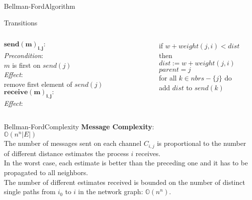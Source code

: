 \documentclass[pdf]{beamer}
\begin{document}
\begin{frame}{Bellman-Ford}{Algorithm}
    \begin{block}{Transitions}
        \vspace{2mm}
        \begin{columns}
            $\mathbf{send(m)_{i, j}:}$\\ 
            \emph{Precondition}: \\ 
            \small $m$ is first on $send(j)$ \\
            \normalsize \emph{Effect}: \\
            \small remove first element of $send(j)$
            \normalsize $\mathbf{receive(m)_{i, j}: }$ \\
            \emph{Effect}: \\
            \small
            \begin{tcolorbox}[colframe=red]
                if $w + weight(j, i) < dist$ then \\
                \hspace*{\parindent} $dist := w + weight(j, i)$ \\
                \hspace*{\parindent} $parent = j$ \\
                \hspace*{\parindent} for all $k \in nbrs - \{j\}$ do \\
                \hspace*{\parindent} \hspace*{\parindent} add $dist$ to $send(k)$ \\
            \end{tcolorbox}
        \end{columns}
    \end{block}
\end{frame}

\begin{frame}{Bellman-Ford}{Complexity}
	\textbf{Message Complexity}: \\
    \vspace{8pt}
    \pause
	$\mathbb{O}(n^n |E|)$ \\
    \vspace{8pt}
    \pause
    \small
    The number of messages sent on each channel $C_{i, j}$ is proportional to the number of different distance estimates the process $i$ receives. \\
    \vspace{8pt}
    \pause
    In the worst case, each estimate is better than the preceding one and it has to be propagated to all neighbors. \\
    \vspace{8pt}
    \pause 
    The number of different estimates received is bounded on the number of distinct single paths from $i_0$ to $i$ in the network graph: $\mathbb{O}(n^n)$.
\end{frame}
\end{document}
